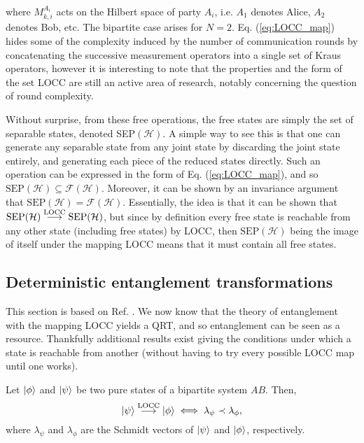\noindent where $M^{A_i}_{k, i}$ acts on the Hilbert space of party $A_i$, i.e. $A_1$ denotes Alice, $A_2$ denotes Bob, etc. The bipartite case arises for $N=2$. Eq. (\ref{eq:LOCC_map}) hides some of the complexity induced by the number of communication rounds by concatenating the successive measurement operators into a single set of Kraus operators, however it is interesting to note that the properties and the form of the set LOCC are still an active area of research, notably concerning the question of round complexity.

Without surprise, from these free operations, the free states are simply the set of separable states, denoted SEP$(\mathcal{H})$. A simple way to see this is that one can generate any separable state from any joint state by discarding the joint state entirely, and generating each piece of the reduced states directly. Such an operation can be expressed in the form of Eq. (\ref{eq:LOCC_map}), and so $\text{SEP}(\mathcal{H}) \subseteq \mathcal{F}(\mathcal{H})$. Moreover, it can be shown by an invariance argument that $\text{SEP}(\mathcal{H}) = \mathcal{F}(\mathcal{H})$. Essentially, the idea is that it can %
be shown that $\text{SEP}(\mathcal{H}) \overset{\text{LOCC}}{\longrightarrow} \text{SEP}(\mathcal{H})$, but since by definition every free state is reachable from any other state (including free states) by LOCC, then $\text{SEP}(\mathcal{H})$ being the image of itself under the mapping LOCC means that it must contain all free states. %



\subsection{Deterministic entanglement transformations} \label{sec:nielsen}

This section is based on Ref. \cite{nielsen_conditions_1999}. We now know that the theory of entanglement with the mapping LOCC yields a QRT, and so entanglement can be seen as a resource. Thankfully additional results exist giving the conditions under which a state is reachable from another (without having to try every possible LOCC map until one works).

\begin{theorem} \label{th:nielsen}
    Let $\ket{\phi}$ and $\ket{\psi}$ be two pure states of a bipartite system $AB$. Then,
    \begin{equation}
        \ket{\psi} \overset{\text{LOCC}}{\longrightarrow} \ket{\phi} \iff \lambda_\psi \prec \lambda_\phi,
    \end{equation}
    where $\lambda_\psi$ and $\lambda_\phi$ are the Schmidt vectors of $\ket{\psi}$ and $\ket{\phi}$, respectively.
\end{theorem}

